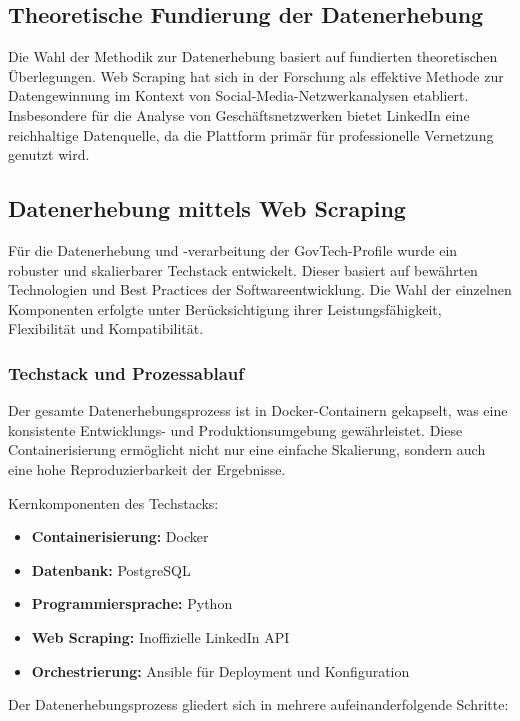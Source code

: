 \documentclass[a4paper,11pt]{article}
\begin{document}
\subsection{Theoretische Fundierung der Datenerhebung}

Die Wahl der Methodik zur Datenerhebung basiert auf fundierten theoretischen Überlegungen. Web Scraping hat sich in der Forschung als effektive Methode zur Datengewinnung im Kontext von Social-Media-Netzwerkanalysen etabliert. Insbesondere für die Analyse von Geschäftsnetzwerken bietet LinkedIn eine reichhaltige Datenquelle, da die Plattform primär für professionelle Vernetzung genutzt wird.


\subsection{Datenerhebung mittels Web Scraping}

Für die Datenerhebung und -verarbeitung der GovTech-Profile wurde ein robuster und skalierbarer Techstack entwickelt. Dieser basiert auf bewährten Technologien und Best Practices der Softwareentwicklung. Die Wahl der einzelnen Komponenten erfolgte unter Berücksichtigung ihrer Leistungsfähigkeit, Flexibilität und Kompatibilität.

\subsubsection{Techstack und Prozessablauf}

Der gesamte Datenerhebungsprozess ist in Docker-Containern gekapselt, was eine konsistente Entwicklungs- und Produktionsumgebung gewährleistet. Diese Containerisierung ermöglicht nicht nur eine einfache Skalierung, sondern auch eine hohe Reproduzierbarkeit der Ergebnisse.

Kernkomponenten des Techstacks:

\begin{itemize}
    \item \textbf{Containerisierung:} Docker
    \item \textbf{Datenbank:} PostgreSQL
    \item \textbf{Programmiersprache:} Python
    \item \textbf{Web Scraping:} Inoffizielle LinkedIn API \parencite{tomquirk2023}
    \item \textbf{Orchestrierung:} Ansible für Deployment und Konfiguration
\end{itemize}

Der Datenerhebungsprozess gliedert sich in mehrere aufeinanderfolgende Schritte:
\end{document}
